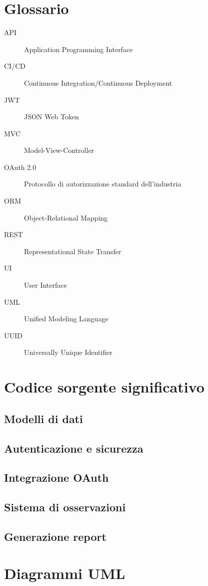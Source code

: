 \documentclass[12pt,a4paper,oneside]{report}
\begin{document}
\appendix

\chapter{Glossario}
\begin{description}
    \item[API] Application Programming Interface
    \item[CI/CD] Continuous Integration/Continuous Deployment
    \item[JWT] JSON Web Token
    \item[MVC] Model-View-Controller
    \item[OAuth 2.0] Protocollo di autorizzazione standard dell'industria
    \item[ORM] Object-Relational Mapping
    \item[REST] Representational State Transfer
    \item[UI] User Interface
    \item[UML] Unified Modeling Language
    \item[UUID] Universally Unique Identifier
\end{description}

\chapter{Codice sorgente significativo}
\section{Modelli di dati}
\section{Autenticazione e sicurezza}
\section{Integrazione OAuth}
\section{Sistema di osservazioni}
\section{Generazione report}

\chapter{Diagrammi UML}
\end{document}
